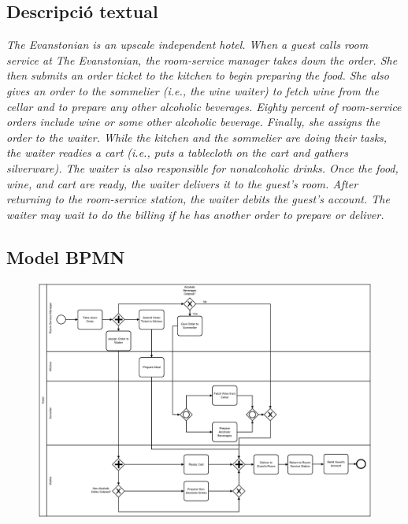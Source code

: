 \subsection*{Descripció textual}

\textit{The Evanstonian is an upscale independent hotel. When a guest calls room service at The Evanstonian, the room-service manager takes down the order. She then submits an order ticket to the kitchen to begin preparing the food. She also gives an order to the sommelier (i.e., the wine waiter) to fetch wine from the cellar and to prepare any other alcoholic beverages. Eighty percent of room-service orders include wine or some other alcoholic beverage. Finally, she assigns the order to the waiter. While the kitchen and the sommelier are doing their tasks, the waiter readies a cart (i.e., puts a tablecloth on the cart and gathers silverware). The waiter is also responsible for nonalcoholic drinks. Once the food, wine, and cart are ready, the waiter delivers it to the guest's room. After returning to the room-service station, the waiter debits the guest's account. The waiter may wait to do the billing if he has another order to prepare or deliver.}

\subsection*{Model BPMN}

\begin{figure}[!h]
    \centering
    \includegraphics[width=\textwidth]{figures/benchmark/Hotel.png}
\end{figure}

\clearpage


